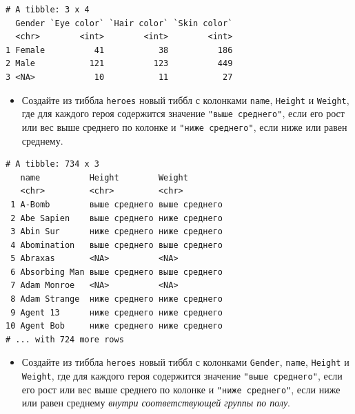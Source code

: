 \documentclass[
]{book}
\newenvironment{Shaded}{\begin{snugshade}}{\end{snugshade}}
\newcommand{\ControlFlowTok}[1]{\textcolor[rgb]{0.13,0.29,0.53}{\textbf{#1}}}
\newcommand{\DataTypeTok}[1]{\textcolor[rgb]{0.13,0.29,0.53}{#1}}
\newcommand{\KeywordTok}[1]{\textcolor[rgb]{0.13,0.29,0.53}{\textbf{#1}}}
\newcommand{\NormalTok}[1]{#1}
\newcommand{\OperatorTok}[1]{\textcolor[rgb]{0.81,0.36,0.00}{\textbf{#1}}}
\newcommand{\OtherTok}[1]{\textcolor[rgb]{0.56,0.35,0.01}{#1}}
\newcommand{\StringTok}[1]{\textcolor[rgb]{0.31,0.60,0.02}{#1}}
\providecommand{\tightlist}{%
  \setlength{\itemsep}{0pt}\setlength{\parskip}{0pt}}
\begin{document}
\begin{verbatim}
# A tibble: 3 x 4
  Gender `Eye color` `Hair color` `Skin color`
  <chr>        <int>        <int>        <int>
1 Female          41           38          186
2 Male           121          123          449
3 <NA>            10           11           27
\end{verbatim}

\begin{itemize}
\tightlist
\item
  Создайте из тиббла \texttt{heroes} новый тиббл с колонками \texttt{name}, \texttt{Height} и \texttt{Weight}, где для каждого героя содержится значение \texttt{"выше\ среднего"}, если его рост или вес выше среднего по колонке и \texttt{"ниже\ среднего"}, если ниже или равен среднему.
\end{itemize}

\begin{Shaded}
\end{Shaded}

\begin{verbatim}
# A tibble: 734 x 3
   name          Height        Weight       
   <chr>         <chr>         <chr>        
 1 A-Bomb        выше среднего выше среднего
 2 Abe Sapien    выше среднего ниже среднего
 3 Abin Sur      ниже среднего ниже среднего
 4 Abomination   выше среднего выше среднего
 5 Abraxas       <NA>          <NA>         
 6 Absorbing Man выше среднего выше среднего
 7 Adam Monroe   <NA>          <NA>         
 8 Adam Strange  ниже среднего ниже среднего
 9 Agent 13      ниже среднего ниже среднего
10 Agent Bob     ниже среднего ниже среднего
# ... with 724 more rows
\end{verbatim}

\begin{itemize}
\tightlist
\item
  Создайте из тиббла \texttt{heroes} новый тиббл с колонками \texttt{Gender}, \texttt{name}, \texttt{Height} и \texttt{Weight}, где для каждого героя содержится значение \texttt{"выше\ среднего"}, если его рост или вес выше среднего по колонке и \texttt{"ниже\ среднего"}, если ниже или равен среднему \emph{внутри соответствующей группы по полу}.
\end{itemize}
\end{document}
